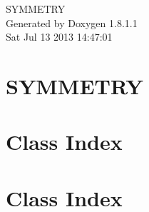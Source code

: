 \documentclass{book}
\begin{document}
\hypersetup{pageanchor=false,citecolor=blue}
\begin{titlepage}
\vspace*{7cm}
\begin{center}
{\Large S\-Y\-M\-M\-E\-T\-R\-Y }\\
\vspace*{1cm}
{\large Generated by Doxygen 1.8.1.1}\\
\vspace*{0.5cm}
{\small Sat Jul 13 2013 14:47:01}\\
\end{center}
\end{titlepage}
\clearemptydoublepage
{}
\tableofcontents
\clearemptydoublepage
{}
\hypersetup{pageanchor=true,citecolor=blue}
\chapter{S\-Y\-M\-M\-E\-T\-R\-Y}
\label{index}\hypertarget{index}{}
\chapter{Class Index}

\chapter{Class Index}

\end{document}
